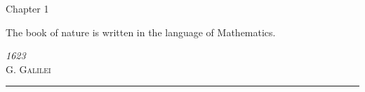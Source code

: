\begin{titlepage}
\noindent
\titlefont Chapter 1\par
\epigraph{The book of nature is written in the language of Mathematics.}%
{\textit{1623}\\ \textsc{G. Galilei}}
\null\vfill
\vspace*{1cm}
\noindent
\hfill
\begin{minipage}{0.35\linewidth}
    \begin{flushright}
        \printauthor
    \end{flushright}
\end{minipage}
%
\begin{minipage}{0.02\linewidth}
    \rule{1pt}{60pt}
\end{minipage}
\titlepagedecoration

\end{titlepage}
